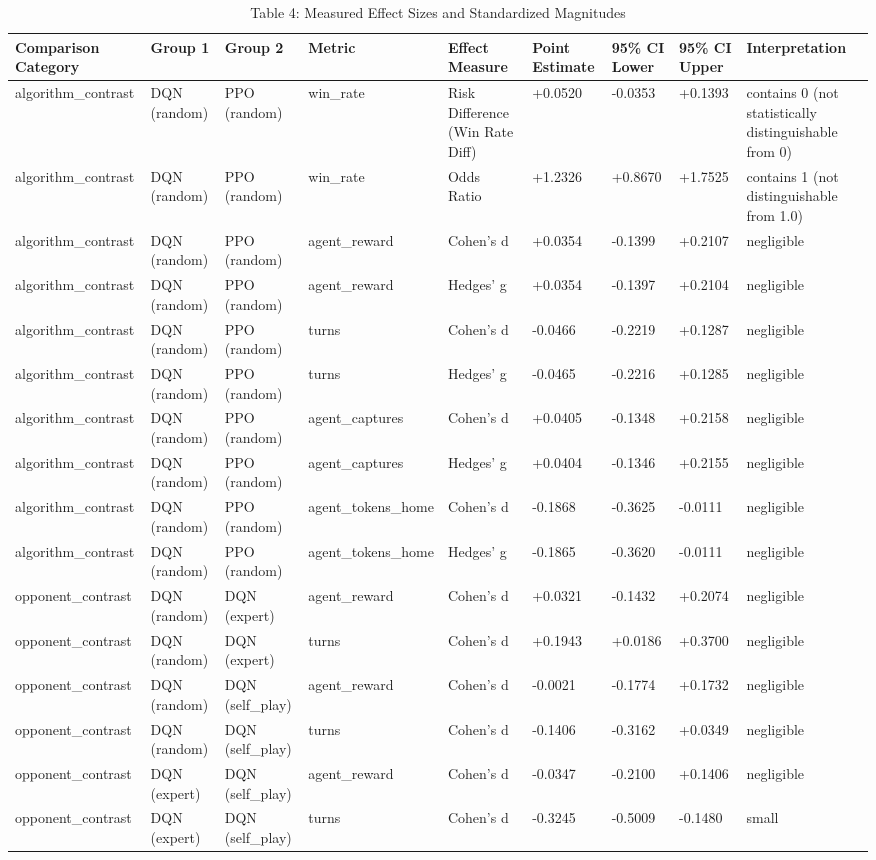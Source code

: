 \begin{table}
\caption{Table 4: Measured Effect Sizes and Standardized Magnitudes}
\label{tab:table4_effect_sizes}
\begin{tabular}{lllllllll}
\toprule
Comparison Category & Group 1 & Group 2 & Metric & Effect Measure & Point Estimate & 95\% CI Lower & 95\% CI Upper & Interpretation \\
\midrule
algorithm\_contrast & DQN (random) & PPO (random) & win\_rate & Risk Difference (Win Rate Diff) & +0.0520 & -0.0353 & +0.1393 & contains 0 (not statistically distinguishable from 0) \\
algorithm\_contrast & DQN (random) & PPO (random) & win\_rate & Odds Ratio & +1.2326 & +0.8670 & +1.7525 & contains 1 (not distinguishable from 1.0) \\
algorithm\_contrast & DQN (random) & PPO (random) & agent\_reward & Cohen's d & +0.0354 & -0.1399 & +0.2107 & negligible \\
algorithm\_contrast & DQN (random) & PPO (random) & agent\_reward & Hedges' g & +0.0354 & -0.1397 & +0.2104 & negligible \\
algorithm\_contrast & DQN (random) & PPO (random) & turns & Cohen's d & -0.0466 & -0.2219 & +0.1287 & negligible \\
algorithm\_contrast & DQN (random) & PPO (random) & turns & Hedges' g & -0.0465 & -0.2216 & +0.1285 & negligible \\
algorithm\_contrast & DQN (random) & PPO (random) & agent\_captures & Cohen's d & +0.0405 & -0.1348 & +0.2158 & negligible \\
algorithm\_contrast & DQN (random) & PPO (random) & agent\_captures & Hedges' g & +0.0404 & -0.1346 & +0.2155 & negligible \\
algorithm\_contrast & DQN (random) & PPO (random) & agent\_tokens\_home & Cohen's d & -0.1868 & -0.3625 & -0.0111 & negligible \\
algorithm\_contrast & DQN (random) & PPO (random) & agent\_tokens\_home & Hedges' g & -0.1865 & -0.3620 & -0.0111 & negligible \\
opponent\_contrast & DQN (random) & DQN (expert) & agent\_reward & Cohen's d & +0.0321 & -0.1432 & +0.2074 & negligible \\
opponent\_contrast & DQN (random) & DQN (expert) & turns & Cohen's d & +0.1943 & +0.0186 & +0.3700 & negligible \\
opponent\_contrast & DQN (random) & DQN (self\_play) & agent\_reward & Cohen's d & -0.0021 & -0.1774 & +0.1732 & negligible \\
opponent\_contrast & DQN (random) & DQN (self\_play) & turns & Cohen's d & -0.1406 & -0.3162 & +0.0349 & negligible \\
opponent\_contrast & DQN (expert) & DQN (self\_play) & agent\_reward & Cohen's d & -0.0347 & -0.2100 & +0.1406 & negligible \\
opponent\_contrast & DQN (expert) & DQN (self\_play) & turns & Cohen's d & -0.3245 & -0.5009 & -0.1480 & small \\
\bottomrule
\end{tabular}
\end{table}
